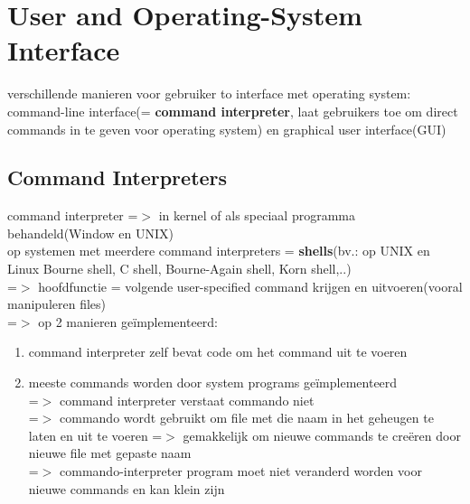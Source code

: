 \documentclass{report}
\begin{document}
\section{User and Operating-System Interface}
verschillende manieren voor gebruiker to interface met operating system: command-line interface(= \textbf{command interpreter}, laat gebruikers toe om direct commands in te geven voor operating system) en graphical user interface(GUI)
\subsection{Command Interpreters}
command interpreter =$>$ in kernel of als speciaal programma behandeld(Window en UNIX)
\\op systemen met meerdere command interpreters = \textbf{shells}(bv.: op UNIX en Linux Bourne shell, C shell, Bourne-Again shell, Korn shell,..)
\\=$>$ hoofdfunctie = volgende user-specified command krijgen en uitvoeren(vooral manipuleren files)
\\=$>$ op 2 manieren ge\"implementeerd:
\begin{enumerate}
\item command interpreter zelf bevat code om het command uit te voeren
\item meeste commands worden door system programs ge\"implementeerd 
\\=$>$ command interpreter verstaat commando niet
\\=$>$ commando wordt gebruikt om file met die naam in het geheugen te laten en uit te voeren =$>$ gemakkelijk om nieuwe commands te cre\"eren door nieuwe file met gepaste naam
\\=$>$ commando-interpreter program moet niet veranderd worden voor nieuwe commands en kan klein zijn
\end{enumerate}
\end{document}
